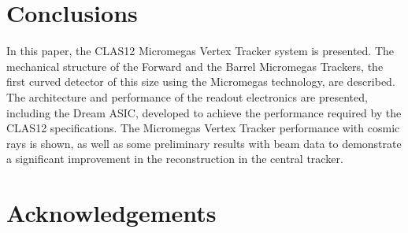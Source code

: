 \section{Conclusions}

In this paper, the CLAS12 Micromegas Vertex Tracker system is presented. The mechanical structure of the
Forward and the Barrel Micromegas Trackers, the first curved detector of this size using the Micromegas technology,
are described. The architecture and performance of the readout electronics are presented, including the Dream ASIC,
developed to achieve the performance required by the CLAS12 specifications. The Micromegas Vertex Tracker
performance with cosmic rays is shown, as well as some preliminary results with beam data to demonstrate a significant
improvement in the reconstruction in the central tracker.

\section{Acknowledgements}


